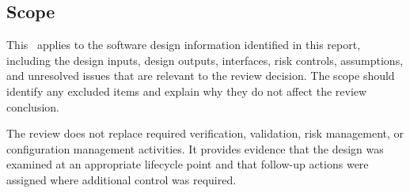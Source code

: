 \subsection{Scope}
This \stdDesignReview\ applies to the software design information identified in
this report, including the design inputs, design outputs, interfaces, risk
controls, assumptions, and unresolved issues that are relevant to the review
decision.  The scope should identify any excluded items and explain why they do
not affect the review conclusion.

\tlcVspace

The review does not replace required verification, validation, risk management,
or configuration management activities.  It provides evidence that the design was
examined at an appropriate lifecycle point and that follow-up actions were
assigned where additional control was required.
